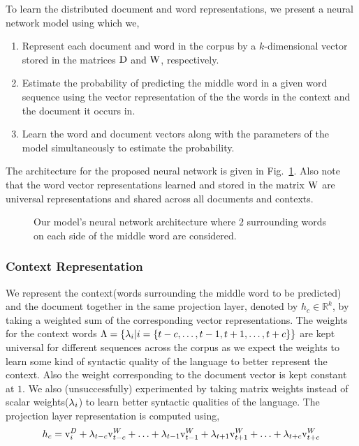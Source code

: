 To learn the distributed document and word representations, we present a neural network model using which we,
\begin{enumerate}
\item Represent each document and word in the corpus by a $k$-dimensional vector stored in the matrices $\mathrm{D}$ and $\mathrm{W}$, respectively.
\item Estimate the probability of predicting the middle word in a given word sequence using the vector representation of the the words in the context and the document it occurs in.
\item Learn the word and document vectors along with the parameters of the model simultaneously to estimate the probability.
\end{enumerate}
The architecture for the proposed neural network is given in Fig.~\ref{fig:nn:archi}.
Also note that the word vector representations learned and stored in the matrix $\mathrm{W}$ are universal representations and shared across all documents and contexts.
\begin{figure}[h!]
    \centering
        
    \caption{Our model's neural network architecture where $2$ surrounding words on each side of the middle word are considered.}
    \label{fig:nn:archi}
\end{figure}

\subsubsection{Context Representation}
We represent the context(words surrounding the middle word to be predicted) and the document together in the same projection layer, denoted by $h_{c} \in \mathbb{R}^{k}$, by taking a weighted sum of the corresponding vector representations. 
The weights for the context words $\Lambda = \{\lambda_{i} | i=\{t-c, \ldots, t-1, t+1, \ldots, t+c\}\}$ are kept universal for different sequences across the corpus as we expect the weights to learn some kind of syntactic quality of the language to better represent the context. Also the weight corresponding to the document vector is kept constant at $1$. 
We also (unsuccessfully) experimented by taking matrix weights instead of scalar weights($\lambda_{i}$) to learn better syntactic qualities of the language. 
The projection layer representation is computed using,
\begin{equation}
\label{eq:hidden_vec}
h_{c} = \mathrm{v}^{D}_{i} + \lambda_{t-c}\mathrm{v}^{W}_{t-c} + \ldots + \lambda_{t-1}\mathrm{v}^{W}_{t-1} + \lambda_{t+1}\mathrm{v}^{W}_{t+1} + \ldots + \lambda_{t+c}\mathrm{v}^{W}_{t+c}
\end{equation}

